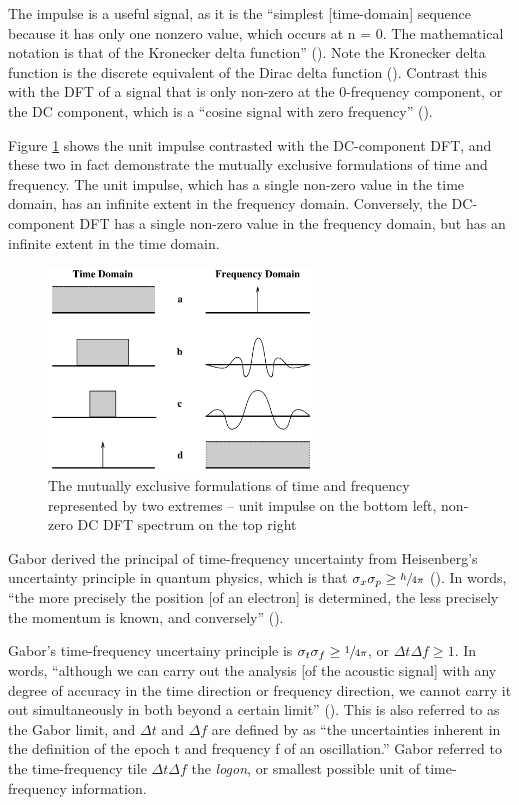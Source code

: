 \documentclass[report.tex]{subfiles}
\begin{document}
The impulse is a useful signal, as it is the ``simplest [time-domain] sequence because it has only one nonzero value, which occurs at n = 0. The mathematical notation is that of the Kronecker delta function'' (\cite[Chapter~5]{dspfirst}). Note the Kronecker delta function is the discrete equivalent of the Dirac delta function (\cite[Chapter~2]{melbook}). Contrast this with the DFT of a signal that is only non-zero at the 0-frequency component, or the DC component, which is a ``cosine signal with zero frequency'' (\cite[Chapter~3]{dspfirst}).

Figure \ref{fig:gaborfirst} shows the unit impulse contrasted with the DC-component DFT, and these two in fact demonstrate the mutually exclusive formulations of time and frequency. The unit impulse, which has a single non-zero value in the time domain, has an infinite extent in the frequency domain. Conversely, the DC-component DFT has a single non-zero value in the frequency domain, but has an infinite extent in the time domain.

\begin{figure}[ht]
	\centering
	\includegraphics[width=7cm]{./images-tftheory/gabor13.png}
	\caption{The mutually exclusive formulations of time and frequency represented by two extremes -- unit impulse on the bottom left, non-zero DC DFT spectrum on the top right}
	\label{fig:gaborfirst}
\end{figure}

Gabor derived the principal of time-frequency uncertainty from Heisenberg's uncertainty principle in quantum physics, which is that $\sigma_{x}\sigma_{p} \ge \sfrac{h}{4\pi}$ (\cite{hallm}). In words, ``the more precisely the position [of an electron] is determined, the less precisely the momentum is known, and conversely'' (\cite{heisenberg1927}).

Gabor's time-frequency uncertainy principle is $\sigma_{t}\sigma_{f} \ge \sfrac{1}{4\pi}$, or $\Delta t\Delta f \ge 1$. In words, ``although we can carry out the analysis [of the acoustic signal] with any degree of accuracy in the time direction or frequency direction, we cannot carry it out simultaneously in both beyond a certain limit'' (\cite{gabor1946}). This is also referred to as the Gabor limit, and $\Delta t$ and $\Delta f$ are defined by \textcite{gabor1946} as ``the uncertainties inherent in the definition of the epoch t and frequency f of an oscillation.'' Gabor referred to the time-frequency tile $\Delta t \Delta f$ the \textit{logon}, or smallest possible unit of time-frequency information.
\end{document}
